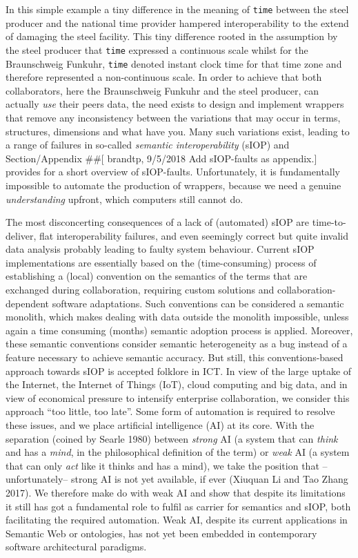 \documentclass[a4paper,11pt,oneside,oldfontcommands]{memoir}
\newcounter{para}
\theoremstyle{definition}
\theoremstyle{break}		%
\numberwithin{equation}{chapter}
\numberwithin{figure}{chapter}
\begin{document}
In this simple example a tiny difference in the meaning of \texttt{time}
between the steel producer and the national time provider hampered
interoperability to the extend of damaging the steel facility. This tiny
difference rooted in the assumption by the steel producer that
\texttt{time} expressed a continuous scale whilst for the Braunschweig
Funkuhr, \texttt{time} denoted instant clock time for that time zone and
therefore represented a non-continuous scale. In order to achieve that
both collaborators, here the Braunschweig Funkuhr and the steel
producer, can actually \emph{use} their peers data, the need exists to
design and implement wrappers that remove any inconsistency between the
variations that may occur in terms, structures, dimensions and what have
you. Many such variations exist, leading to a range of failures in
so-called \emph{semantic interoperability} (sIOP) and Section/Appendix
\#\#{[} brandtp, 9/5/2018 Add sIOP-faults as appendix.{]} provides for a
short overview of sIOP-faults. Unfortunately, it is fundamentally
impossible to automate the production of wrappers, because we need a
genuine \emph{understanding} upfront, which computers still cannot do.

The most disconcerting consequences of a lack of (automated) sIOP are
time-to-deliver, flat interoperability failures, and even seemingly
correct but quite invalid data analysis probably leading to faulty
system behaviour. Current sIOP implementations are essentially based on
the (time-consuming) process of establishing a (local) convention on the
semantics of the terms that are exchanged during collaboration,
requiring custom solutions and collaboration-dependent software
adaptations. Such conventions can be considered a semantic monolith,
which makes dealing with data outside the monolith impossible, unless
again a time consuming (months) semantic adoption process is applied.
Moreover, these semantic conventions consider semantic heterogeneity as
a bug instead of a feature necessary to achieve semantic accuracy. But
still, this conventions-based approach towards sIOP is accepted folklore
in ICT. In view of the large uptake of the Internet, the Internet of
Things (IoT), cloud computing and big data, and in view of economical
pressure to intensify enterprise collaboration, we consider this
approach ``too little, too late''. Some form of automation is required
to resolve these issues, and we place artificial intelligence (AI) at
its core. With the separation (coined by Searle 1980) between
\emph{strong} AI (a system that can \emph{think} and has a \emph{mind},
in the philosophical definition of the term) or \emph{weak} AI (a system
that can only \emph{act} like it thinks and has a mind), we take the
position that --unfortunately-- strong AI is not yet available, if ever
(Xiuquan Li and Tao Zhang 2017). We therefore make do with weak AI and
show that despite its limitations it still has got a fundamental role to
fulfil as carrier for semantics and sIOP, both facilitating the required
automation. Weak AI, despite its current applications in Semantic Web or
ontologies, has not yet been embedded in contemporary software
architectural paradigms.
\end{document}
